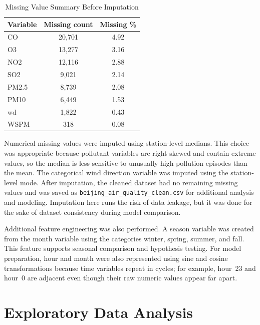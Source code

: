 \documentclass[stu,12pt,floatsintext]{apa7}
\begin{document}
\begin{table}[H]
  \begin{threeparttable}
  \caption{Missing Value Summary Before Imputation}
  \label{tab:missing}
  \begin{tabular}{lcc}
    \toprule
    \textbf{Variable} & \textbf{Missing count} & \textbf{Missing \%} \\
    \midrule
    CO    & 20{,}701 & 4.92 \\
    O3    & 13{,}277 & 3.16 \\
    NO2   & 12{,}116 & 2.88 \\
    SO2   &  9{,}021 & 2.14 \\
    PM2.5 &  8{,}739 & 2.08 \\
    PM10  &  6{,}449 & 1.53 \\
    wd    &  1{,}822 & 0.43 \\
    WSPM  &    318   & 0.08 \\
    \bottomrule
  \end{tabular}
  \end{threeparttable}
\end{table}

Numerical missing values were imputed using station-level medians. This choice was
appropriate because pollutant variables are right-skewed and contain extreme values, so
the median is less sensitive to unusually high pollution episodes than the mean. The
categorical wind direction variable was imputed using the station-level mode. After
imputation, the cleaned dataset had no remaining missing values and was saved as
\texttt{beijing\_air\_quality\_clean.csv} for additional analysis and modeling.
Imputation here runs the risk of data leakage, but it was done for the sake of dataset
consistency during model comparison.

Additional feature engineering was also performed. A season variable was created from the
month variable using the categories winter, spring, summer, and fall. This feature
supports seasonal comparison and hypothesis testing. For model preparation, hour and month
were also represented using sine and cosine transformations because time variables repeat
in cycles; for example, hour~23 and hour~0 are adjacent even though their raw numeric
values appear far apart.

\section{Exploratory Data Analysis}
\end{document}
